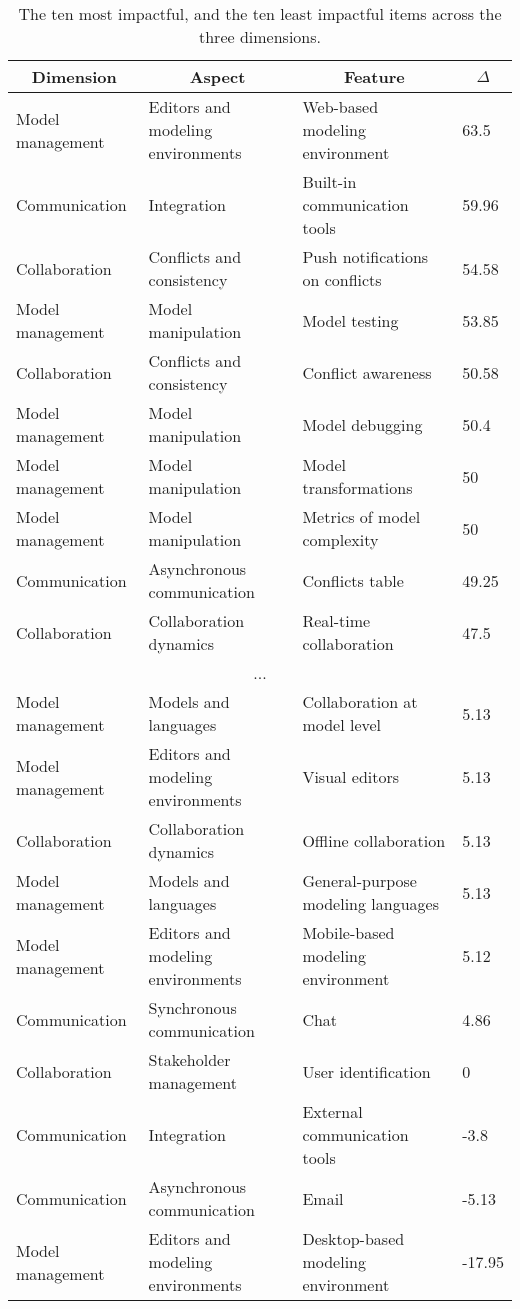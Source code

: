 
  \begin{table*}[]
  \centering
  \notsotiny
  \caption{ The ten most impactful, and the ten least impactful items across the three dimensions.}
\label{tab:top-bottom-delta}
\begin{tabular}{@{}llll@{}}
  \toprule
\multicolumn{1}{c}{\textbf{Dimension}} & \multicolumn{1}{c}{\textbf{Aspect}} & \multicolumn{1}{c}{\textbf{Feature}} & \multicolumn{1}{c}{\textbf{$\Delta$}} \\ 

  \midrule
  Model management & Editors and modeling environments & Web-based modeling environment & 63.5 \\ 
Communication & Integration & Built-in communication tools & 59.96 \\ 
Collaboration & Conflicts and consistency & Push notifications on conflicts & 54.58 \\ 
Model management & Model manipulation & Model testing & 53.85 \\ 
Collaboration & Conflicts and consistency & Conflict awareness & 50.58 \\ 
Model management & Model manipulation & Model debugging & 50.4 \\ 
Model management & Model manipulation & Model transformations & 50 \\ 
Model management & Model manipulation & Metrics of model complexity & 50 \\ 
Communication & Asynchronous communication & Conflicts table & 49.25 \\ 
Collaboration & Collaboration dynamics & Real-time collaboration & 47.5 \\ 
\multicolumn{4}{c}{...} \\ 
Model management & Models and languages & Collaboration at model level & 5.13 \\ 
Model management & Editors and modeling environments & Visual editors & 5.13 \\ 
Collaboration & Collaboration dynamics & Offline collaboration & 5.13 \\ 
Model management & Models and languages & General-purpose modeling languages & 5.13 \\ 
Model management & Editors and modeling environments & Mobile-based modeling environment & 5.12 \\ 
Communication & Synchronous communication & Chat & 4.86 \\ 
Collaboration & Stakeholder management & User identification & 0 \\ 
Communication & Integration & External communication tools & -3.8 \\ 
Communication & Asynchronous communication & Email & -5.13 \\ 
Model management & Editors and modeling environments & Desktop-based modeling environment & -17.95 \\ 
\bottomrule
  \end{tabular}%
  \end{table*}